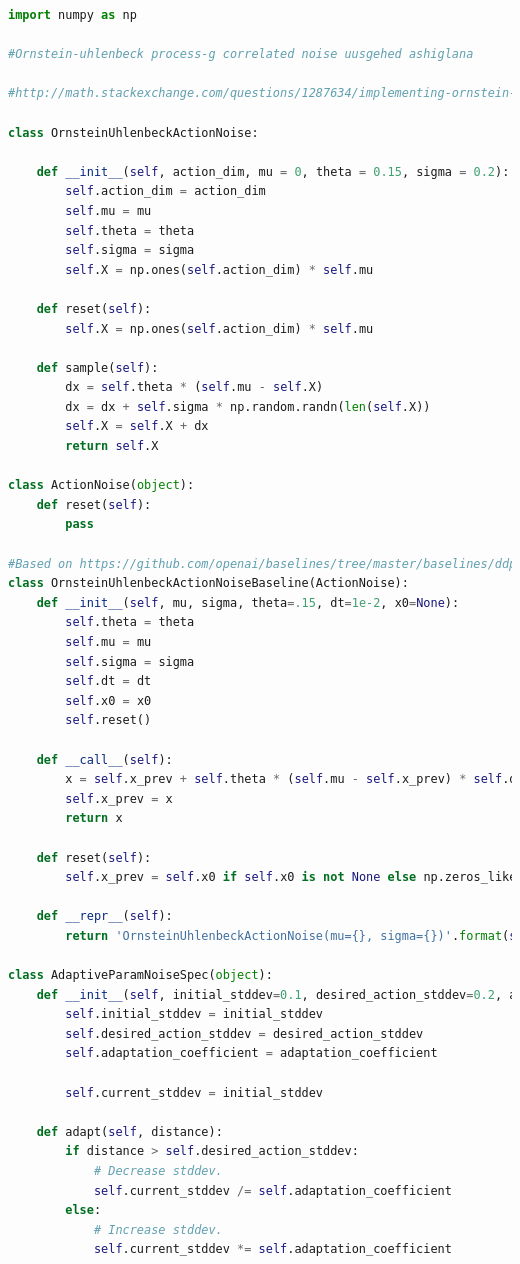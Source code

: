 \documentclass[12pt,A4]{report}
\begin{document}
\begin{lstlisting}[language=Python, caption=utilities.py, frame=single]
import numpy as np

#Ornstein-uhlenbeck process-g correlated noise uusgehed ashiglana

#http://math.stackexchange.com/questions/1287634/implementing-ornstein-uhlenbeck-in-matlab

class OrnsteinUhlenbeckActionNoise:

	def __init__(self, action_dim, mu = 0, theta = 0.15, sigma = 0.2):
		self.action_dim = action_dim
		self.mu = mu
		self.theta = theta
		self.sigma = sigma
		self.X = np.ones(self.action_dim) * self.mu

	def reset(self):
		self.X = np.ones(self.action_dim) * self.mu

	def sample(self):
		dx = self.theta * (self.mu - self.X)
		dx = dx + self.sigma * np.random.randn(len(self.X))
		self.X = self.X + dx
		return self.X

class ActionNoise(object):
    def reset(self):
        pass

#Based on https://github.com/openai/baselines/tree/master/baselines/ddpg
class OrnsteinUhlenbeckActionNoiseBaseline(ActionNoise):
    def __init__(self, mu, sigma, theta=.15, dt=1e-2, x0=None):
        self.theta = theta
        self.mu = mu
        self.sigma = sigma
        self.dt = dt
        self.x0 = x0
        self.reset()

    def __call__(self):
        x = self.x_prev + self.theta * (self.mu - self.x_prev) * self.dt + self.sigma * np.sqrt(self.dt) * np.random.normal(size=self.mu.shape)
        self.x_prev = x
        return x

    def reset(self):
        self.x_prev = self.x0 if self.x0 is not None else np.zeros_like(self.mu)

    def __repr__(self):
        return 'OrnsteinUhlenbeckActionNoise(mu={}, sigma={})'.format(self.mu, self.sigma)

class AdaptiveParamNoiseSpec(object):
    def __init__(self, initial_stddev=0.1, desired_action_stddev=0.2, adaptation_coefficient=1.01):
        self.initial_stddev = initial_stddev
        self.desired_action_stddev = desired_action_stddev
        self.adaptation_coefficient = adaptation_coefficient

        self.current_stddev = initial_stddev

    def adapt(self, distance):
        if distance > self.desired_action_stddev:
            # Decrease stddev.
            self.current_stddev /= self.adaptation_coefficient
        else:
            # Increase stddev.
            self.current_stddev *= self.adaptation_coefficient


\end{lstlisting}
\end{document}
